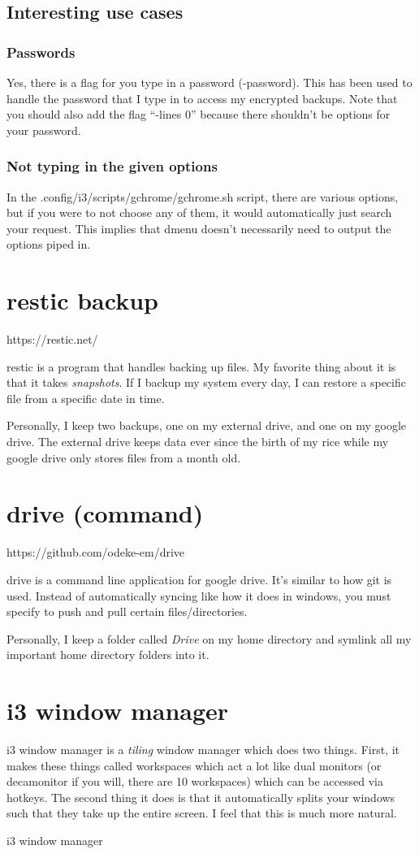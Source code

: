 \documentclass[letterpaper,12pt]{article}
\begin{document}
\subsection{Interesting use cases}
\subsubsection{Passwords}
\par Yes, there is a flag for you type in a password (-password).
This has been used to handle the password that I type in to access my encrypted backups.
Note that you should also add the flag ``-lines 0'' because there shouldn't be options for your password.
\subsubsection{Not typing in the given options}
\par In the .config/i3/scripts/gchrome/gchrome.sh script, there are various options, but if you were to not choose any of them, it would automatically just search your request.
This implies that dmenu doesn't necessarily need to output the options piped in.
\section{restic backup}
https://restic.net/
\par restic is a program that handles backing up files.
My favorite thing about it is that it takes \emph{snapshots}.
If I backup my system every day, I can restore a specific file from a specific date in time.
\par Personally, I keep two backups, one on my external drive, and one on my google drive.
The external drive keeps data ever since the birth of my rice while my google drive only stores files from a month old.
\section{drive (command)}
https://github.com/odeke-em/drive
\par drive is a command line application for google drive.
It's similar to how git is used.
Instead of automatically syncing like how it does in windows, you must specify to push and pull certain files/directories.
\par Personally, I keep a folder called \emph{Drive} on my home directory and symlink all my important home directory folders into it.
\section{i3 window manager}
\par i3 window manager is a \emph{tiling} window manager which does two things.
First, it makes these things called workspaces which act a lot like dual monitors (or decamonitor if you will, there are 10 workspaces) which can be accessed via hotkeys.
The second thing it does is that it automatically splits your windows such that they take up the entire screen.
I feel that this is much more natural.
\par i3 window manager
\end{document}
